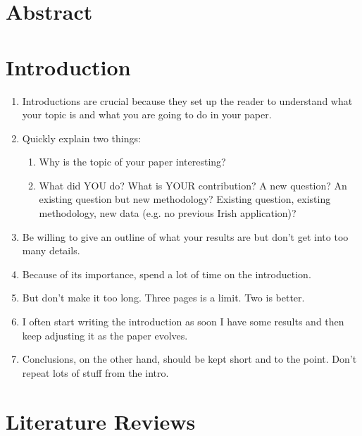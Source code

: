 \section{Abstract}



\section{Introduction}

\begin{enumerate}
	\item Introductions are crucial because they set up the reader to understand what your topic is and what you are going to do in your paper.
	\item Quickly explain two things:
	      \begin{enumerate}
		      \item Why is the topic of your paper interesting?
		      \item What did YOU do? What is YOUR contribution? A new question? An existing question but new methodology? Existing question, existing methodology, new data (e.g. no previous Irish application)?
	      \end{enumerate}

	\item Be willing to give an outline of what your results are but don’t get into too many details.
	\item Because of its importance, spend a lot of time on the introduction.
	\item But don’t make it too long. Three pages is a limit. Two is better.
	\item I often start writing the introduction as soon I have some results and then keep adjusting it as the paper evolves.
	\item Conclusions, on the other hand, should be kept short and to the point. Don’t repeat lots of stuff from the intro.
\end{enumerate}

\section{Literature Reviews}

